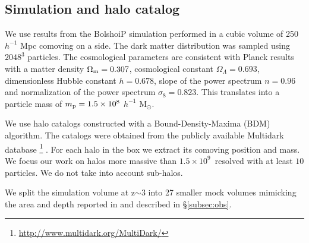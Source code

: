 \documentclass{emulateapj}
\newcommand{\hMsun}{{\ifmmode{h^{-1}{\rm {M_{\odot}}}}\else{$h^{-1}{\rm{M_{\odot}}}$}\fi}}
\begin{document}
\subsection{Simulation and halo catalog}
\label{subsec:sim}

We use results from the BolshoiP simulation \citep{Bolshoi,BolshoiP} 
performed in a cubic volume of 250 $h^{-1}$ Mpc comoving on a side. 
The dark matter distribution was sampled using  $2048^{3}$
particles. 
The cosmological parameters are consistent with Planck
results \citep{Planck2014} with a matter density 
$\Omega_{\rm m} = 0.307$, cosmological constant
$\Omega_{\Lambda}=0.693$, dimensionless Hubble constant $h=0.678$, slope
of the power spectrum  $n=0.96$ and normalization of the power
spectrum $\sigma_{8}=0.823$.  
This translates into a particle mass of  $m_{\rm p}=1.5\times 10^{8}$
$h^{-1}$ M$_{\odot}$.    


We use halo catalogs constructed with a Bound-Density-Maxima (BDM)
algorithm. 
The catalogs were obtained from the publicly available Multidark
database  \footnote{\url{http://www.multidark.org/MultiDark/}}
\citep{MultiDark}. 
For each  halo in the box we extract its comoving position and mass.  
We focus our work on halos more massive than $1.5\times
10^{9}$\hMsun\ resolved with at least  $10$ particles. 
We do not take into account sub-halos.


We split the simulation volume at z$\sim$3 into  27 smaller mock
volumes mimicking the  area and depth reported in \citet{Bielby16} and
described in \S \ref{subsec:obs}.   
\end{document}
